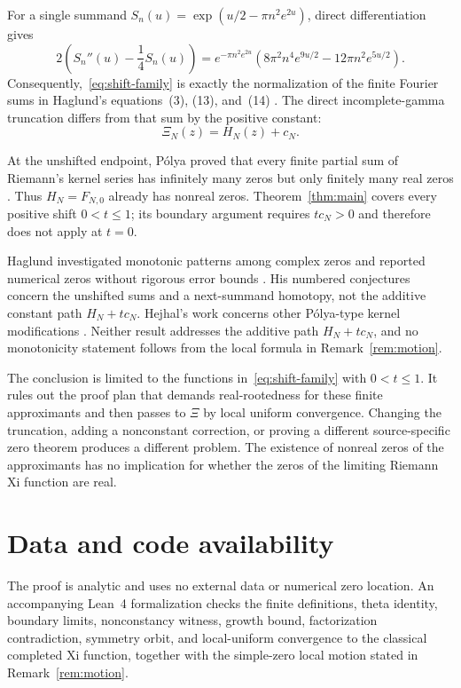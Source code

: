 \documentclass[11pt,a4paper]{amsart}
\theoremstyle{remark}
\newcommand{\XiN}{\Xi_N}
\begin{document}
For a single summand
$S_n(u)=\exp(u/2-\pi n^2e^{2u})$, direct differentiation gives
\begin{equation}\label{eq:haglund-normalization}
 2\left(S_n''(u)-\frac14S_n(u)\right)
 =e^{-\pi n^2e^{2u}}
 \left(8\pi^2n^4e^{9u/2}-12\pi n^2e^{5u/2}\right).
\end{equation}
Consequently,~\eqref{eq:shift-family} is exactly the normalization of the
finite Fourier sums in Haglund's equations~(3), (13), and~(14)
\cite{Haglund2011}.  The direct incomplete-gamma truncation differs from
that sum by the positive constant:
\begin{equation}\label{eq:haglund-shift}
 \XiN(z)=H_N(z)+c_N.
\end{equation}

At the unshifted endpoint, P\'olya proved that every finite partial sum of
Riemann's kernel series has infinitely many zeros but only finitely many real
zeros \cite[\S4]{Polya1926}.  Thus $H_N=F_{N,0}$ already has nonreal zeros.
Theorem~\ref{thm:main} covers every positive shift $0<t\leq1$; its boundary
argument requires $t c_N>0$ and therefore does not apply at $t=0$.

Haglund investigated monotonic patterns among complex zeros and reported
numerical zeros without rigorous error bounds \cite{Haglund2011}.  His
numbered conjectures concern the unshifted sums and a next-summand homotopy,
not the additive constant path $H_N+t c_N$.  Hejhal's work concerns other
P\'olya-type kernel modifications \cite{Hejhal1990}.  Neither result addresses
the additive path $H_N+t c_N$, and no monotonicity statement follows from the
local formula in Remark~\ref{rem:motion}.

The conclusion is limited to the functions in~\eqref{eq:shift-family} with
$0<t\leq1$.  It rules out the proof plan that demands real-rootedness for
these finite approximants and then passes to $\Xi$ by local uniform
convergence.  Changing the truncation, adding a nonconstant correction, or
proving a different source-specific zero theorem produces a different
problem.  The existence of nonreal zeros of the approximants has no
implication for whether the zeros of the limiting Riemann Xi function are
real.

\section*{Data and code availability}

The proof is analytic and uses no external data or numerical zero location.
An accompanying Lean~4 formalization checks the finite definitions, theta
identity, boundary limits, nonconstancy witness, growth bound, factorization
contradiction, symmetry orbit, and local-uniform convergence to the classical
completed Xi function, together with the simple-zero local motion stated in
Remark~\ref{rem:motion}.
\end{document}
